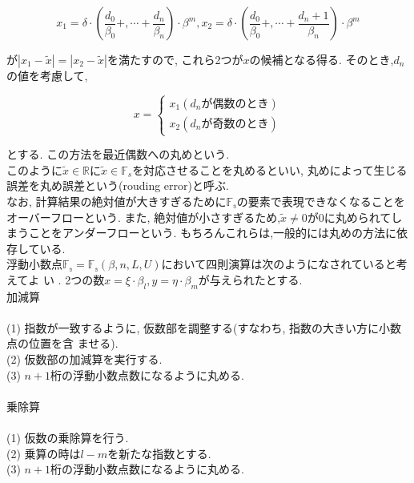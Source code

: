 \documentclass[11pt,a4paper]{jsreport}
\theoremstyle{definition}
\begin{document}
  \begin{equation}
    x_1 = \delta \cdot \left(\frac{d_0}{\beta_0}+, \cdots +\frac{d_n}{\beta_n}\right)\cdot\beta^m,x_2 = \delta \cdot \left(\frac{d_0}{\beta_0}+, \cdots +\frac{d_n+1}{\beta_n}\right)\cdot\beta^m
  \end{equation}

\noindent が$|x_1 - \tilde{x}| = |x_2 - \tilde{x}|$を満たすので, これら2つが$x$の候補となる得る. そのとき,$d_n$の値を考慮して,

  \begin{equation*}
    x = \left\{
    \begin{aligned}
      x_1(d_n\text{が偶数のとき}) \\
      x_2(d_n\text{が奇数のとき})
    \end{aligned}
    \right.
  \end{equation*}

\noindent とする. この方法を最近偶数への丸めという. \\
\indent このように$\tilde{x} \in \mathbb{R}$に$\tilde{x} \in \mathbb{F}_s$を対応させることを丸めるといい, 丸めによって生じる誤差を丸め誤差という(rouding error)と呼ぶ. \\
\indent なお, 計算結果の絶対値が大きすぎるために$\mathbb{F_s}$の要素で表現できなくなることをオーバーフローという. また, 絶対値が小さすぎるため,$\tilde{x} \neq 0$が$0$に丸められてしまうことをアンダーフローという. もちろんこれらは,一般的には丸めの方法に依存している. \\
\indent  浮動小数点$\mathbb{F_s}=\mathbb{F_s}(\beta,n,L,U)$において四則演算は次のようになされていると考えてよ
い . 2つの数$x=\xi\cdot\beta_l,y=\eta\cdot\beta_m$が与えられたとする. \\
	加減算 \\
\\
	(1)  指数が一致するように, 仮数部を調整する(すなわち, 指数の大きい方に小数点の位置を含
               ませる). \\
	(2)  仮数部の加減算を実行する. \\
	(3)  $n + 1$桁の浮動小数点数になるように丸める. \\
\\
	乗除算 \\
\\
	(1)  仮数の乗除算を行う. \\
	(2)  乗算の時は$l - m$を新たな指数とする. \\
	(3)  $n + 1$桁の浮動小数点数になるように丸める. \\
\end{document}
